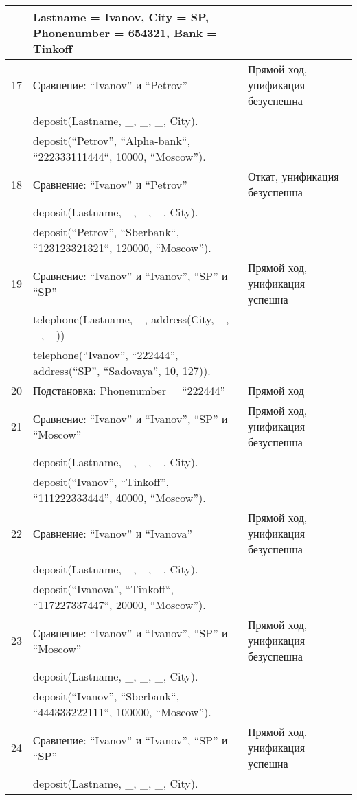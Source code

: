 {\begin{longtable}{|p{1.15cm}|p{8cm}|p{8cm}|}
       & Lastname = Ivanov, City = SP, Phonenumber = 654321, Bank = Tinkoff & \\
    \hline
    17 & Сравнение: ``Ivanov'' и ``Petrov'' & Прямой ход, унификация безуспешна \\
       & deposit(Lastname, \_, \_, \_, City). & \\
       & deposit(``Petrov'', ``Alpha-bank``, ``222333111444``, 10000, ``Moscow''). & \\
    \hline
    18 & Сравнение: ``Ivanov'' и ``Petrov'' & Откат, унификация безуспешна \\
       & deposit(Lastname, \_, \_, \_, City). & \\
       & deposit(``Petrov'', ``Sberbank``, ``123123321321``, 120000, ``Moscow''). & \\
    \hline
    19 & Сравнение: ``Ivanov'' и ``Ivanov'', ``SP'' и ``SP'' & Прямой ход, унификация успешна \\
      & telephone(Lastname, \_, address(City, \_, \_, \_)) & \\
      & telephone(``Ivanov'', ``222444'', address(``SP'', ``Sadovaya'', 10, 127)). & \\
    \hline
    20 & Подстановка: Phonenumber = ``222444'' & Прямой ход \\
    \hline
    21 & Сравнение: ``Ivanov'' и ``Ivanov'', ``SP'' и ``Moscow'' & Прямой ход, унификация безуспешна \\
       & deposit(Lastname, \_, \_, \_, City). & \\
       & deposit(``Ivanov'', ``Tinkoff'', ``111222333444'', 40000, ``Moscow''). & \\
    \hline
    22 & Сравнение: ``Ivanov'' и ``Ivanova'' & Прямой ход, унификация безуспешна \\
       & deposit(Lastname, \_, \_, \_, City). & \\
       & deposit(``Ivanova'', ``Tinkoff``, ``117227337447``, 20000, ``Moscow''). & \\
    \hline
    23 & Сравнение: ``Ivanov'' и ``Ivanov'', ``SP'' и ``Moscow'' & Прямой ход, унификация безуспешна \\
       & deposit(Lastname, \_, \_, \_, City). & \\
       & deposit(``Ivanov'', ``Sberbank``, ``444333222111``, 100000, ``Moscow''). & \\
    \hline
    24 & Сравнение: ``Ivanov'' и ``Ivanov'', ``SP'' и ``SP'' & Прямой ход, унификация успешна \\
       & deposit(Lastname, \_, \_, \_, City). & \\

\end{longtable}}

